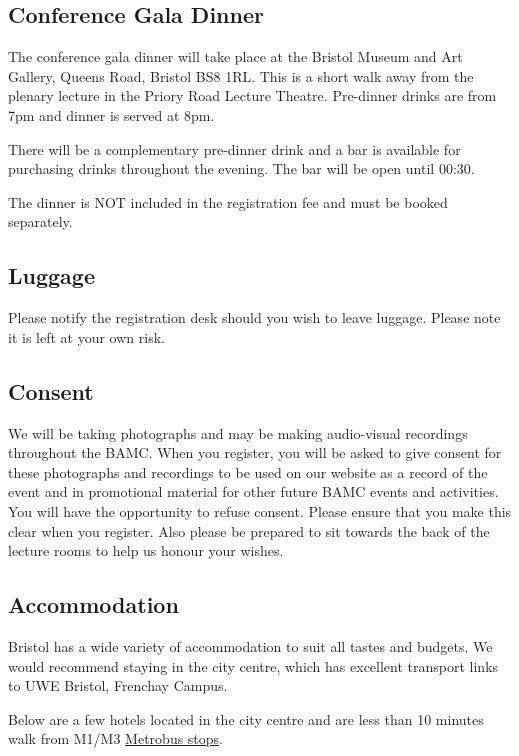 \documentclass[12pt,a4paper]{article}
\begin{document}
\subsection{Conference Gala Dinner}

The conference gala dinner will take place at the Bristol Museum and Art Gallery, Queens Road, Bristol BS8 1RL. This is a short walk away from the plenary lecture in the Priory Road Lecture Theatre. Pre-dinner drinks are from 7pm and dinner is served at 8pm.

There will be a complementary pre-dinner drink and a bar is available for purchasing drinks throughout the evening. The bar will be open until 00:30.

The dinner is NOT included in the registration fee and must be booked separately.

\subsection{Luggage}

Please notify the registration desk should you wish to leave luggage. Please note it is left at your own risk.

\subsection{Consent}

We will be taking photographs and may be making audio-visual recordings throughout the BAMC. When you register, you will be asked to give consent for these photographs and recordings to be used on our website as a record of the event and in promotional material for other future BAMC events and activities. You will have the opportunity to refuse consent. Please ensure that you make this clear when you register. Also please be prepared to sit towards the back of the lecture rooms to help us honour your wishes.

\subsection{Accommodation}

Bristol has a wide variety of accommodation to suit all tastes and budgets. We would recommend staying in the city centre, which has excellent transport links to UWE Bristol, Frenchay Campus.

Below are a few hotels located in the city centre and are less than 10 minutes walk from M1/M3 \href{https://journeyplanner.travelwest.info/routes/region/0/}{Metrobus stops}.
\end{document}
